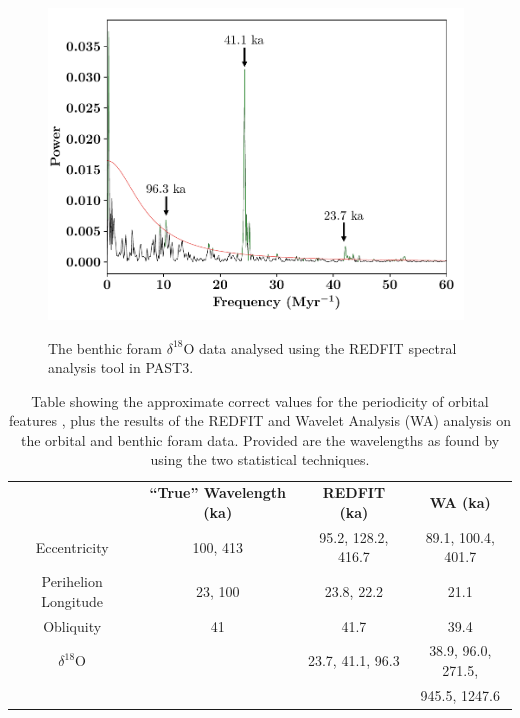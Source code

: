 \documentclass[12pt, onecolumn]{revtex4}    %
\begin{document}
\begin{figure}[!h]
\begin{center}
\includegraphics[width=11cm]{figures/d18O_redfit}
\caption[]{The benthic foram $\delta^{18}$O data analysed using the REDFIT spectral analysis tool in PAST3.}
\vspace{-3ex}
\label{fig:d18o_redfit}
\end{center}
\end{figure}

\begin{table}[h!]
\centering
\begin{tabular}{c@{\hskip 20pt}c@{\hskip 20pt}c@{\hskip 20pt}c} 
 \hline
  & \textbf{``True'' Wavelength (ka)} &\textbf{REDFIT (ka)} & \textbf{WA (ka)} \\ [0.5ex] 
 Eccentricity & 100, 413 & 95.2, 128.2, 416.7 & 89.1, 100.4,  401.7\\
 Perihelion Longitude & 23, 100 & 23.8, 22.2 & 21.1 \\
 Obliquity & 41 & 41.7 & 39.4 \\
 $\delta^{18}$O & & 23.7, 41.1, 96.3  & 38.9, 96.0, 271.5, \\
 & & & 945.5, 1247.6 \\
 \hline
\end{tabular}
\caption{Table showing the approximate correct values for the periodicity of orbital features \cite{campisano_milankovitch}, plus the results of the REDFIT and Wavelet Analysis (WA) analysis on the orbital and benthic foram data. Provided are the wavelengths as found by using the two statistical techniques.}
\vspace{-0.5em}
\label{table:final_results}
\end{table}
\end{document}
